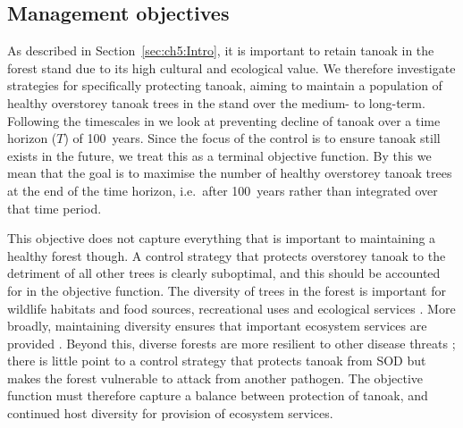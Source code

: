 \subsection{Management objectives}\label{sec:ch6:mgmt_objs}

As described in Section~\ref{sec:ch5:Intro}, it is important to retain tanoak in the forest stand due to its high cultural and ecological value. We therefore investigate strategies for specifically protecting tanoak, aiming to maintain a population of healthy overstorey tanoak trees in the stand over the medium- to long-term. Following the timescales in \citet{cobb_ecosystem_2012} we look at preventing decline of tanoak over a time horizon ($T$) of 100~years. Since the focus of the control is to ensure tanoak still exists in the future, we treat this as a terminal objective function. By this we mean that the goal is to maximise the number of healthy overstorey tanoak trees at the end of the time horizon, i.e.\ after 100~years rather than integrated over that time period.

This objective does not capture everything that is important to maintaining a healthy forest though. A control strategy that protects overstorey tanoak to the detriment of all other trees is clearly suboptimal, and this should be accounted for in the objective function. The diversity of trees in the forest is important for wildlife habitats and food sources, recreational uses and ecological services \citep{swiecki_reference_2013}. More broadly, maintaining diversity ensures that important ecosystem services are provided \citep{cadotte_beyond_2011, gamfeldt_higher_2013}. Beyond this, diverse forests are more resilient to other disease threats \citep{keesing_impacts_2010}; there is little point to a control strategy that protects tanoak from SOD but makes the forest vulnerable to attack from another pathogen. The objective function must therefore capture a balance between protection of tanoak, and continued host diversity for provision of ecosystem services.

